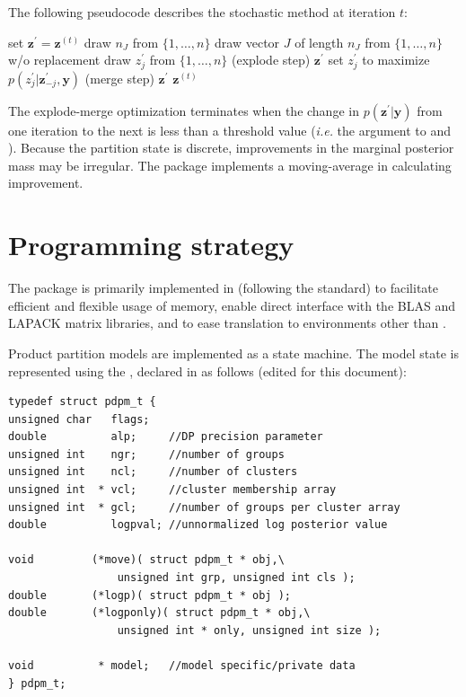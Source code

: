 \documentclass[article, nojss]{jss}
\newcommand{\bz}{\boldsymbol{z}}
\newcommand{\by}{\boldsymbol{y}}
\begin{document}
The following pseudocode describes the stochastic method at iteration $t$:
{
\singlespacing
\begin{algorithmic}[1]
    \STATE set $\bz^{\prime} = \bz^{(t)}$
    \STATE draw $n_J$ from $\{1,\ldots,n\}$
    \STATE draw vector $J$ of length $n_J$ from $\{1,\ldots,n\}$ w/o replacement
	\STATE draw $z_j^{\prime}$ from $\{1,\ldots,n\}$ (explode step)
    \ENDFOR
    \IF{$p(\bz^{\prime}|\by) > p(\bz^{(t)}|\by)$}
	\RETURN $\bz^{\prime}$
    \ENDIF
	\STATE set $z_j^{\prime}$ to maximize $p(z_j^{\prime}|\bz_{-j}^{\prime},\by)$ (merge step)
    \ENDFOR
    \IF{$p(\bz^{\prime}|\by) > p(\bz^{(t)}|\by)$}
	\RETURN $\bz^{\prime}$
    \ELSE
	\RETURN $\bz^{(t)}$
    \ENDIF
\end{algorithmic}
}  
The explode-merge optimization terminates when the change in $p(\bz^{\prime}|\by)$ from one iteration to the next is less than a threshold value ({\it i.e.} the  argument to  and ). Because the partition state is discrete, improvements in the marginal posterior mass may be irregular. The  package implements a moving-average in calculating improvement.

\section[Code]{Programming strategy} \label{Code}

The  package is primarily implemented in  (following the  standard) to facilitate efficient and flexible usage of memory, enable direct interface with the BLAS and LAPACK matrix libraries, and to ease translation to environments other than .

Product partition models are implemented as a state machine. The model state is represented using the  , declared in  as follows (edited for this document):
\begin{verbatim}
typedef struct pdpm_t {
unsigned char   flags;
double          alp;     //DP precision parameter
unsigned int    ngr;     //number of groups
unsigned int    ncl;     //number of clusters
unsigned int  * vcl;     //cluster membership array
unsigned int  * gcl;     //number of groups per cluster array
double          logpval; //unnormalized log posterior value

void         (*move)( struct pdpm_t * obj,\
                 unsigned int grp, unsigned int cls );
double       (*logp)( struct pdpm_t * obj );
double       (*logponly)( struct pdpm_t * obj,\
                 unsigned int * only, unsigned int size );

void          * model;   //model specific/private data
} pdpm_t;
\end{verbatim}
\end{document}
